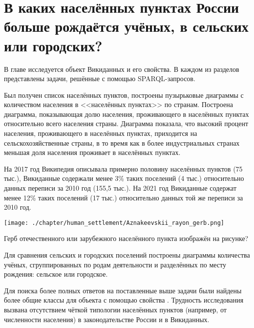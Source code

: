 \chapter{В каких населённых пунктах России больше рождаётся учёных, в сельских или городских?}
\label{ch:human-settlement}

В главе исследуется объект Викиданных  и его свойства. 
В каждом из разделов представлены задачи, решённые с помощью SPARQL-запросов. 
%

Был получен список населённых пунктов, 
построены пузырьковые диаграммы с количеством населения в <<населённых пунктах>> по странам. 
Построена диаграмма, показывающая долю населения, 
проживающего в населённых пунктах относительно всего населения страны. 
Диаграмма показала, что высокий процент населения, проживающего в населённых пунктах, 
приходится на сельскохозяйственные страны, в то время как в более индустриальных странах 
меньшая доля населения проживает в населённых пунктах. 

На 2017 год Википедия описывала примерно половину населённых пунктов (75 тыс.), 
Викиданные содержали менее 3\% таких поселений (4 тыс.) относительно данных переписи за 2010 год (155,5 тыс.). 
На 2021 год Викиданные содержат менее 12\% таких поселений (17 тыс.) 
относительно данных той же переписи за 2010 год. 

\begin{marginfigure}[0.0cm]{%
\texttt{[image: ./chapter/human\_settlement/Aznakeevskii\_rayon\_gerb.png]}}
  \caption{Герб отечественного или зарубежного населённого пункта изображён на рисунке?}%
  \label{fig:flag_question_human_settlements1}%
\end{marginfigure}
Для сравнения сельских и городских поселений 
построены диаграммы количества учёных, сгруппированных по родам деятельности 
и разделённых по месту рождения: сельское или городское.

Для поиска более полных ответов на поставленные выше задачи  
были найдены более общие классы для объекта  
с помощью свойства . 
Трудность исследования вызвана отсутствием чёткой типологии населённых пунктов 
(например, от численности населения) в законодательстве России и в Викиданных.



